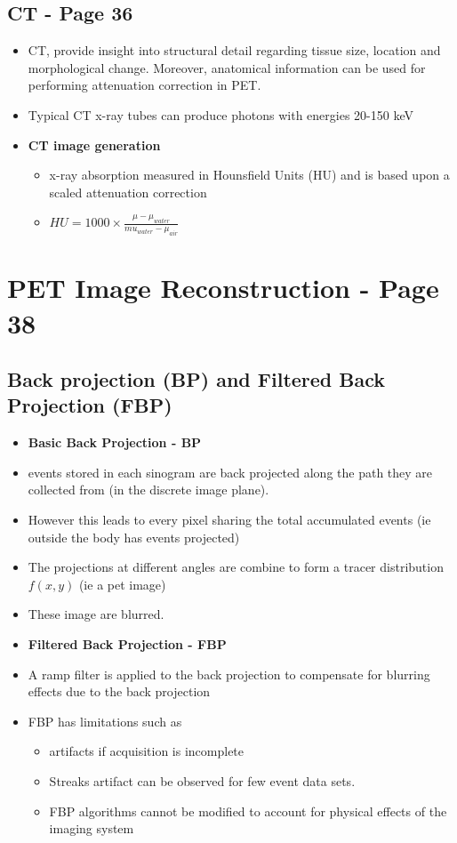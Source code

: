 \documentclass{article}
\begin{document}
\subsection{CT  - Page 36}
\begin{itemize}
\item CT, provide insight into structural detail regarding tissue size, location and morphological change. Moreover, anatomical information can be used for performing attenuation correction in PET.
\item Typical CT x-ray tubes can produce photons with energies 20-150 keV
\item \textbf{CT image generation}
\begin{itemize}
\item x-ray absorption measured in Hounsfield Units (HU) and is based upon a scaled attenuation correction
\item  $ HU = 1000 \times \frac{\mu - \mu_{water}}{mu_{water} - \mu_{air}}$
\end{itemize}
\end{itemize}
\section{PET Image Reconstruction  - Page 38}
\subsection{Back projection (BP) and Filtered Back Projection (FBP)}
\begin{itemize}
\item \textbf{Basic Back Projection - BP}
\item events stored in each sinogram are back projected along the path they are collected from (in the discrete image plane).
\item However this leads to every pixel sharing the total accumulated events (ie outside the body has events projected)
\item The projections at different angles are combine to form a tracer distribution $f(x,y)$ (ie a pet image)
\item These image are blurred.
\item \textbf{Filtered Back Projection - FBP}
\item A ramp filter is applied to the back projection to compensate for blurring effects due to the back projection
\item FBP has limitations such as 
\begin{itemize}
\item artifacts if acquisition is incomplete
\item Streaks artifact can be observed for few event data sets.
\item FBP algorithms cannot be modified to account for physical effects of the imaging system
\end{itemize}
\end{itemize}
\end{document}
